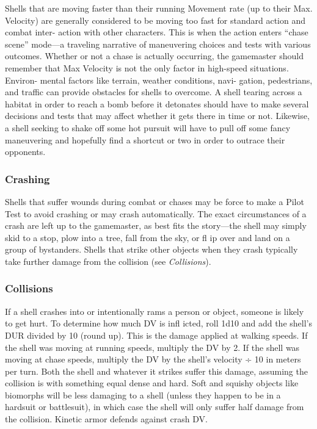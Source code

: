 Shells that are moving faster than their 
running Movement rate (up to their Max. 
Velocity) are generally considered to be 
moving too fast for standard action and combat inter-
action with other characters. This is when the action 
enters ``chase scene'' mode—a traveling narrative of 
maneuvering choices and tests with various outcomes. 
Whether or not a chase is actually occurring, the 
gamemaster should remember that Max Velocity is 
not the only factor in high-speed situations. Environ-
mental factors like terrain, weather conditions, navi-
gation, pedestrians, and traffic can provide obstacles 
for shells to overcome. A shell tearing across a habitat 
in order to reach a bomb before it detonates should 
have to make several decisions and tests that may 
affect whether it gets there in time or not. Likewise, a 
shell seeking to shake off some hot pursuit will have 
to pull off some fancy maneuvering and hopefully find 
a shortcut or two in order to outrace their opponents.

\subsubsection{Crashing}

Shells that suffer wounds during combat or chases 
may be force to make a Pilot Test to avoid crashing 
or may crash automatically. The exact circumstances 
of a crash are left up to the gamemaster, as best fits 
the story—the shell may simply skid to a stop, plow 
into a tree, fall from the sky, or fl ip over and land on 
a group of bystanders. Shells that strike other objects 
when they crash typically take further damage from 
the collision (see \textit{Collisions}).

\subsubsection{Collisions}

If a shell crashes into or intentionally rams a person or 
object, someone is likely to get hurt. To determine how 
much DV is infl icted, roll 1d10 and add the shell's DUR 
divided by 10 (round up). This is the damage applied 
at walking speeds. If the shell was moving at running 
speeds, multiply the DV by 2. If the shell was moving 
at chase speeds, multiply the DV by the shell's velocity 
÷ 10 in meters per turn. Both the shell and whatever 
it strikes suffer this damage, assuming the collision is 
with something equal dense and hard. Soft and squishy 
objects like biomorphs will be less damaging to a shell 
(unless they happen to be in a hardsuit or battlesuit), in 
which case the shell will only suffer half damage from 
the collision. Kinetic armor defends against crash DV.

